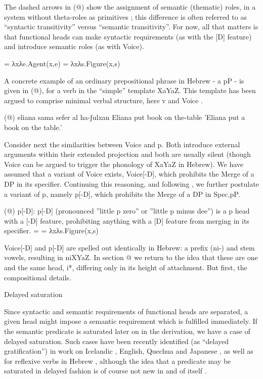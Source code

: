The dashed arrows in (@) show the assignment of semantic (thematic) roles, in a system without theta-roles as primitives \cite{schaefer08,layering15,wood14nllt,wood15springer,woodmarantz17,myler16,kastner17gjgl}; this difference is often referred to as “syntactic transitivity” versus “semantic transitivity”. For now, all that matters is that functional heads can make syntactic requirements (as with the [D] feature) and introduce semantic roles (as with Voice).

      =  λxλe.Agent(x,e) 
      =  λxλs.Figure(x,s) 

A concrete example of an ordinary prepositional phrase in Hebrew - a pP - is given in (@), for a verb in the “simple” template XaYaZ. This template has been argued to comprise minimal verbal structure, here v and Voice \citep{doron03,borer13oup,kastner16nllt,kastner17gjgl}.

   (@)      eliana sama sefer al ha-ʃulxan
         Eliana put book on the-table
         'Eliana put a book on the table.'    
    

Consider next the similarities between Voice and p. Both introduce external arguments within their extended projection and both are usually silent (though Voice can be argued to trigger the phonology of XaYaZ in Hebrew). We have assumed that a variant of Voice exists, Voice[-D], which prohibits the Merge of a DP in its specifier. Continuing this reasoning, and following \cite{wood15springer}, we further postulate a variant of p, namely p[-D], which prohibits the Merge of a DP in Spec,pP.

(@)    p[-D]:
    p[-D] (pronounced ''little p zero'' or ''little p minus dee'') is a p head with a [-D] feature, prohibiting anything with a [D] feature from merging in its specifier.
     =  = λxλs.Figure(x,s)

    Voice[-D] and p[-D] are spelled out identically in Hebrew: a prefix (ni-) and stem vowels, resulting in niXYaZ. In section @ we return to the idea that these are one and the same head, i*, differing only in its height of attachment. But first, the compositional details.

Delayed saturation

Since syntactic and semantic requirements of functional heads are separated, a given head might impose a semantic requirement which is fulfilled immediately. If the semantic predicate is saturated later on in the derivation, we have a case of delayed saturation. Such cases have been recently identified (as “delayed gratification”) in work on Icelandic \citep{wood14nllt,wood15springer}, English, Quechua \citep{myler16mit} and Japanese \citep{woodmarantz17}, as well as for reflexive verbs in Hebrew \citep{kastner17gjgl}, although the idea that a predicate may be saturated in delayed fashion is of course not new in and of itself \citep{higginbotham85}.


